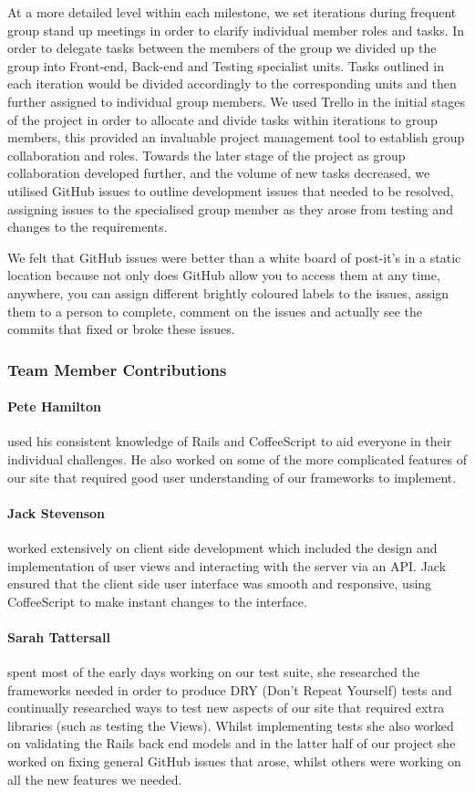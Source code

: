     At a more detailed level within each milestone, we set iterations during frequent group stand up meetings in order to clarify individual member roles and tasks. In order to delegate tasks between the members of the group we divided up the group into Front-end, Back-end and Testing specialist units. Tasks outlined in each iteration would be divided accordingly to the corresponding units and then further assigned to individual group members. We used Trello in the initial stages of the project in order to allocate and divide tasks within iterations to group members, this provided an invaluable project management tool to establish group collaboration and roles. Towards the later stage of the project as group collaboration developed further, and the volume of new tasks decreased, we utilised GitHub issues to outline development issues that needed to be resolved, assigning issues to the specialised group member as they arose from testing and changes to the requirements.

    We felt that GitHub issues were better than a white board of post-it's in a static location because not only does GitHub allow you to access them at any time, anywhere, you can assign different brightly coloured labels to the issues, assign them to a person to complete, comment on the issues and actually see the commits that fixed or broke these issues.

  \subsubsection {Team Member Contributions}
    \paragraph{Pete Hamilton} used his consistent knowledge of Rails and CoffeeScript to aid everyone in their individual challenges. He also worked on some of the more complicated features of our site that required good user understanding of our frameworks to implement.
    \paragraph{Jack Stevenson} worked extensively on client side development which included the design and implementation of user views and interacting with the server via an API. Jack ensured that the client side user interface was smooth and responsive, using CoffeeScript to make instant changes to the interface.
    \paragraph{Sarah Tattersall} spent most of the early days working on our test suite, she researched the frameworks needed in order to produce DRY (Don't Repeat Yourself) tests and continually researched ways to test new aspects of our site that required extra libraries (such as testing the Views). 
    Whilst implementing tests she also worked on validating the Rails back end models and in the latter half of our project she worked on fixing general GitHub issues that arose, whilst others were working on all the new features we needed.
